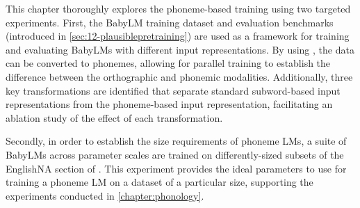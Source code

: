 This chapter thoroughly explores the phoneme-based training using two targeted experiments. First, the BabyLM training dataset and evaluation benchmarks (introduced in \cref{sec:12-plausiblepretraining}) are used as a framework for training and evaluating BabyLMs with different input representations. By using \gpp, the data can be converted to phonemes, allowing for parallel training to establish the difference between the orthographic and phonemic modalities. Additionally, three key transformations are identified that separate standard subword-based input representations from the phoneme-based input representation, facilitating an ablation study of the effect of each transformation.


Secondly, in order to establish the size requirements of phoneme LMs, a suite of BabyLMs across parameter scales are trained on differently-sized subsets of the EnglishNA section of \ipachildes. This experiment provides the ideal parameters to use for training a phoneme LM on a dataset of a particular size, supporting the experiments conducted in \cref{chapter:phonology}.



